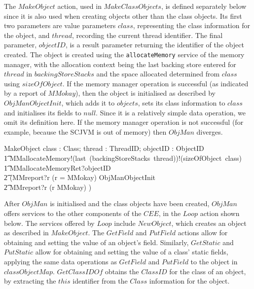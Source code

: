 The $MakeObject$ action, used in $MakeClassObjects$, is defined
separately below since it is also used when creating objects other
than the class objects.
Its first two parameters are value parameters $class$, representing
the class information for the object, and $thread$, recording the
current thread identifier.
The final parameter, $objectID$, is a result parameter returning the
identifier of the object created.
The object is created using the \texttt{allocateMemory} service of the
memory manager, with the allocation context being the last backing
store entered for $thread$ in $backingStoreStacks$ and the space
allocated determined from $class$ using $sizeOfObject$.
If the memory manager operation is successful (as indicated by a
report of $MMokay$), then the object is initialised as described by
$ObjManObjectInit$, which adds it to $objects$, sets its class
information to $class$ and initialises its fields to $null$.
Since it is a relatively simple data operation, we omit its definition
here.
If the memory manager operation is not successful (for example,
because the SCJVM is out of memory) then $ObjMan$ diverges.
\begin{circusaction}
  MakeObject \circdef \circval class : Class; \circval thread : ThreadID; \circres objectID : ObjectID \circspot \\
  \t1 MMallocateMemory!(last~(backingStoreStacks~thread))!(sizeOfObject~class) \then {} \\
  \t1  MMallocateMemoryRet?objectID \then {} \\
  \t2 (MMreport?r \prefixcolon (r = MMokay) \then \lschexpract ObjManObjectInit \rschexpract \\
  \t2 {} \extchoice MMreport?r \prefixcolon (r \neq MMokay) \then \Chaos)
\end{circusaction}

After $ObjMan$ is initialised and the class objects have been created,
$ObjMan$ offers services to the other components of the $CEE$, in the
$Loop$ action shown below.
The services offered by $Loop$ include $NewObject$, which creates an
object as described in $MakeObject$.
The $GetField$ and $PutField$ actions allow for obtaining and setting
the value of an object's field.
Similarly, $GetStatic$ and $PutStatic$ allow for obtaining and setting
the value of a class' static fields, applying the same data operations
as $GetField$ and $PutField$ to the object in $classObjectMap$.
$GetClassIDOf$ obtains the $ClassID$ for the class of an object, by
extracting the $this$ identifier from the $Class$ information for the
object.

